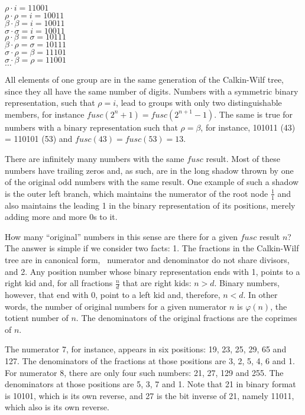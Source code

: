 \documentclass[tikz]{scrreprt}
\newcommand{\Varid}[1]{\mathit{#1}}
\begin{document}
$\rho  \cdot i     = 11001$\\
$\rho  \cdot \rho  = i = 10011$\\
$\beta \cdot \beta = i = 10011$\\
$\sigma \cdot \sigma = i = 10011$\\
$\rho  \cdot \beta = \sigma = 10111$\\
$\beta \cdot \rho  = \sigma = 10111$\\
$\sigma \cdot \rho  = \beta = 11101$\\
$\sigma \cdot \beta = \rho  = 11001$\\
$\dots$

All elements of one group are in the same generation
of the Calkin-Wilf tree,
since they all have the same number of digits.
Numbers with a symmetric binary representation,
such that $\rho = i$, lead to groups with only 
two distinguishable members, for instance
$fusc(2^n+1) = fusc(2^{n+1}-1)$.
The same is true for numbers with a binary representation
such that $\rho = \beta$, for instance, 
101011 (43) = 110101 (53) and $fusc(43) = fusc(53) = 13$.

There are infinitely many numbers
with the same \ensuremath{\Varid{fusc}} result.
Most of these numbers have trailing zeros
and, as such, are in the long shadow thrown 
by one of the original odd numbers with the same result.
One example of such a shadow is the outer left branch,
which maintains the numerator of the root node $\frac{1}{1}$
and also maintains the leading 1 in the binary representation
of its positions, merely adding more and more 0s to it.

How many ``original'' numbers in this sense are there
for a given \ensuremath{\Varid{fusc}} result $n$?
The answer is simple if we consider two facts:
1. The fractions in the Calkin-Wilf tree are in
canonical form, \ie\ numerator and denominator
do not share divisors, and
2. Any position number whose binary representation
ends with 1, points to a right kid and, for all fractions
$\frac{n}{d}$ that are right kids:
$n > d$. Binary numbers, however, that end with 0,
point to a left kid and, therefore, $n < d$.
In other words, the number of original numbers
for a given numerator $n$ is $\varphi(n)$, the totient number of $n$.
The denominators of the original fractions are 
the coprimes of $n$.

The numerator 7, for instance, appears in six positions:
19, 23, 25, 29, 65 and 127.
The denominators of the fractions at those positions are
3, 2, 5, 4, 6 and 1.
For numerator 8, there are only four such numbers:
21, 27, 129 and 255.
The denominators at those positions are 5, 3, 7 and 1.
Note that 21 in binary format is 10101, 
which is its own reverse,
and 27 is the bit inverse of 21, namely 11011,
which also is its own reverse.
\end{document}
